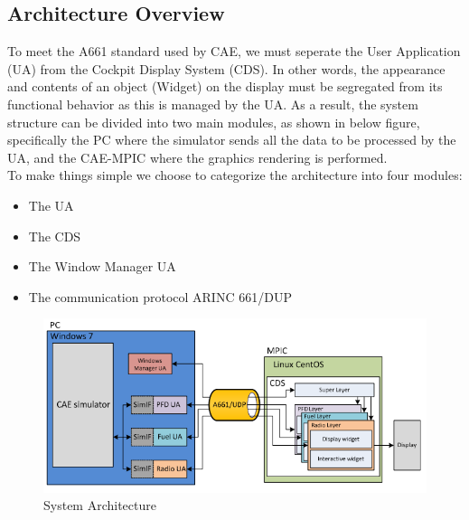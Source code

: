     \subsection{Architecture Overview}
        To meet the A661 standard used by CAE, we must seperate the User Application (UA) from the Cockpit Display System (CDS). 
        In other words, the appearance and contents of an object (Widget) on the display must be segregated from its functional 
        behavior as this is managed by the UA. As a result, the system structure can be divided into two main modules, as shown 
        in below figure, specifically the PC where the simulator sends all the data to be processed by the UA, and the CAE-MPIC 
        where the graphics rendering is performed. \\ 
        \vspace{3mm}
        To make things simple we choose to categorize the architecture into four modules:
        \begin{itemize}
            \item The UA
            \item The CDS 
            \item The Window Manager UA
            \item The communication protocol ARINC 661/DUP
        \end{itemize}
        \begin{figure}[H]
            \centering
            \includegraphics[width=0.6\linewidth]{img/UA.PNG}
            \caption{System Architecture}
        \end{figure}

